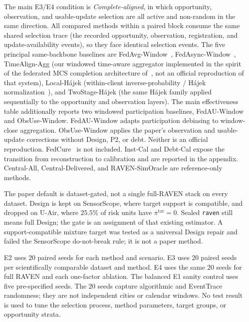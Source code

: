 \documentclass[letterpaper,journal]{IEEEtran}
\begin{document}
The main E3/E4 condition is \emph{Complete-aligned}, in which opportunity,
observation, and usable-update selection are all active and non-random in the
same direction.  All compared methods within a paired block consume the same
shared selection trace (the recorded opportunity, observation, registration,
and update-availability events), so they face identical selection events.
The five principal same-backbone baselines are
FedAvg-Window~\cite{mcmahan2017communication},
FedAsync-Window~\cite{xie2019asynchronous},
TimeAlign-Agg (our windowed time-aware aggregator implemented in the spirit of
the federated MCS completion architecture of~\cite{wang2026federated}, not an
official reproduction of that system),
Local-H\'ajek (within-client inverse-probability / H\'ajek
normalization~\cite{horvitz1952generalization,hajek1971comment}), and
TwoStage-H\'ajek (the same H\'ajek family applied sequentially to the
opportunity and observation layers).  The main effectiveness table additionally
reports two windowed participation baselines, FedAU-Window and
ObsUse-Window.  FedAU-Window adapts participation debiasing
\cite{wang2024lightweight} to window-close aggregation.
ObsUse-Window applies the paper's observation and usable-update
corrections without Design, P2, or debt.  Neither is an official
reproduction.  FedCure~\cite{chen2026fedcure} is not included.  Inst-Cal and Debt-Cal
expose the transition from reconstruction to calibration and are
reported in the appendix.  Central-All, Central-Delivered, and
RAVEN-SimOracle are reference-only methods.

The paper default is dataset-gated, not a single full-RAVEN stack on
every dataset.  Design is kept on SensorScope, where target support is
compatible, and dropped on U-Air, where $25.5\%$ of risk units have
$\pi^{\mathrm{tar}}=0$.  Sealed \texttt{raven} still means full Design;
the gate is an assignment of that existing estimator.  A
support-compatible mixture target was tested as a universal Design
repair and failed the SensorScope do-not-break rule; it is not a paper
method.

E2 uses 20 paired seeds for each method and scenario.  E3 uses 20 paired seeds
per scientifically comparable dataset and method.  E4 uses the same 20 seeds
for full RAVEN and each one-factor ablation.  The balanced E1 sanity control
uses five pre-specified seeds.  The $20$ seeds capture algorithmic and
EventTrace randomness; they are not independent cities or calendar windows.
No test result is used to tune the selection process,
method parameters, target groups, or opportunity strata.
\end{document}
